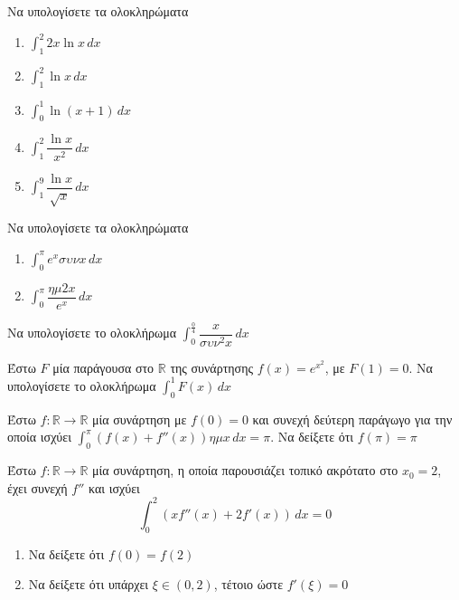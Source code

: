 \documentclass{presentation}
\begin{document}
\begin{askisi}
  Να υπολογίσετε τα ολοκληρώματα
  \begin{enumerate}
    \item<1-> $\int_{1}^{2} 2x\ln x \,dx$
    \item<2-> $\int_{1}^{2} \ln x \,dx$
    \item<3-> $\int_{0}^{1} \ln (x+1) \,dx$
    \item<4-> $\int_{1}^{2} \dfrac{\ln x}{x^2} \,dx$
    \item<5-> $\int_{1}^{9} \dfrac{\ln x}{\sqrt{x}} \,dx$
  \end{enumerate}

\end{askisi}

\begin{askisi}
  Να υπολογίσετε τα ολοκληρώματα
  \begin{enumerate}
    \item<1-> $\int_{0}^{π} e^xσυνx \,dx$
    \item<2-> $\int_{0}^{π} \dfrac{ημ2x}{e^x} \,dx$
  \end{enumerate}

\end{askisi}

\begin{askisi}
  Να υπολογίσετε το ολοκλήρωμα $\int_{0}^{\frac{0}{4}} \dfrac{x}{συν^2x} \,dx$

\end{askisi}

\begin{askisi}
  Έστω $F$ μία παράγουσα στο $\mathbb{R}$ της συνάρτησης $f(x)=e^{x^2}$, με $F(1)=0$. Να υπολογίσετε το ολοκλήρωμα $\int_{0}^{1} F(x) \,dx$

\end{askisi}

\begin{askisi}
  Έστω $f:\mathbb{R}\to\mathbb{R}$ μία συνάρτηση με $f(0)=0$ και συνεχή δεύτερη παράγωγο για την οποία ισχύει $\int_{0}^{π} \left( f(x)+f''(x) \right)ημx  \,dx=π$. Να δείξετε ότι $f(π)=π$

\end{askisi}

\begin{askisi}
  Έστω $f:\mathbb{R}\to\mathbb{R}$ μία συνάρτηση, η οποία παρουσιάζει τοπικό ακρότατο στο $x_0=2$, έχει συνεχή $f''$ και ισχύει
  $$\int_{0}^{2} \left( xf''(x)+2f'(x) \right) \,dx=0$$
  \begin{enumerate}
    \item<1-> Να δείξετε ότι $f(0)=f(2)$
    \item<2-> Να δείξετε ότι υπάρχει $ξ\in (0,2)$, τέτοιο ώστε $f'(ξ)=0$
  \end{enumerate}

\end{askisi}
\end{document}
